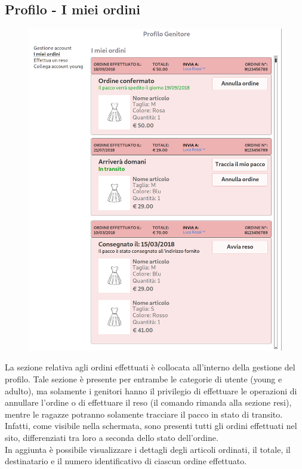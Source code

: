 \documentclass[12pt,a4paper]{report}
\begin{document}
\subsection{Profilo - I miei ordini}
\begin{figure}
\includegraphics[height=0.50\textheight]{"Images Latex/Immagini Wireframe/Desktop/16 - Profilo Ordini"}
\vspace{-5pt}
\end{figure}
La sezione relativa agli ordini effettuati è collocata all'interno della gestione del profilo. Tale sezione è presente per entrambe le categorie di utente (young e adulto), ma solamente i genitori hanno il privilegio di effettuare le operazioni di annullare l'ordine o di effettuare il reso (il comando rimanda alla sezione resi), mentre le ragazze potranno solamente tracciare il pacco in stato di transito.\\
Infatti, come visibile nella schermata, sono presenti tutti gli ordini effettuati nel sito, differenziati tra loro a seconda dello stato dell'ordine.\\ In aggiunta è possibile visualizzare i dettagli degli articoli ordinati, il totale, il destinatario e il numero identificativo di ciascun ordine effettuato.
\newpage
\end{document}
